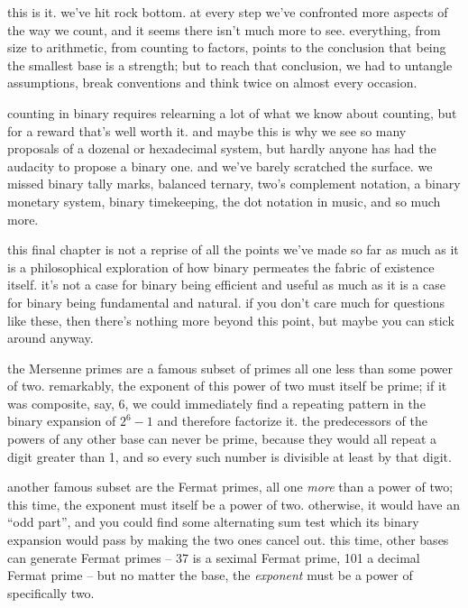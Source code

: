 \documentclass[../best.tex]{subfiles}
\begin{document}

this is it. we've hit rock bottom. at every step we've confronted more aspects of the way we count, and it seems there isn't much more to see. everything, from size to arithmetic, from counting to factors, points to the conclusion that being the smallest base is a strength; but to reach that conclusion, we had to untangle assumptions, break conventions and think twice on almost every occasion.

counting in binary requires relearning a lot of what we know about counting, but for a reward that's well worth it. and maybe this is why we see so many proposals of a dozenal or hexadecimal system, but hardly anyone has had the audacity to propose a binary one. and we've barely scratched the surface. we missed binary tally marks,\myfootnote{} balanced ternary,\myfootnote{} two's complement notation,\myfootnote{} a binary monetary system,\myfootnote{} binary timekeeping,\myfootnote{} the dot notation in music,\myfootnote{} and so much more.

this final chapter is not a reprise of all the points we've made so far as much as it is a philosophical exploration of how binary permeates the fabric of existence itself. it's not a case for binary being efficient and useful as much as it is a case for binary being fundamental and natural. if you don't care much for questions like these, then there's nothing more beyond this point, but maybe you can stick around anyway.

\sectionbreak

the Mersenne primes are a famous subset of primes all one less than some power of two. remarkably, the exponent of this power of two must itself be prime; if it was composite, say, 6, we could immediately find a repeating pattern in the binary expansion of $2^6 - 1$ and therefore factorize it. the predecessors of the powers of any other base can never be prime, because they would all repeat a digit greater than 1, and so every such number is divisible at least by that digit.\myfootnote{}

another famous subset are the Fermat primes, all one \emph{more} than a power of two; this time, the exponent must itself be a power of two. otherwise, it would have an ``odd part'', and you could find some alternating sum test which its binary expansion would pass by making the two ones cancel out. this time, other bases can generate Fermat primes -- 37 is a seximal Fermat prime, 101 a decimal Fermat prime -- but no matter the base, the \emph{exponent} must be a power of specifically two.\myfootnote{}
\end{document}
